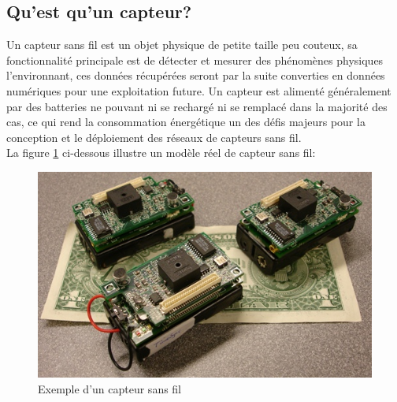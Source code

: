 	\subsection{Qu'est qu'un capteur?}
	Un capteur sans fil est un objet physique de petite taille peu couteux, sa fonctionnalité principale est de détecter et mesurer des phénomènes physiques l'environnant, ces données récupérées seront par la suite converties en données numériques pour une exploitation future. Un capteur est alimenté généralement par des batteries ne pouvant ni se rechargé ni se remplacé dans la majorité des cas, ce qui rend la consommation énergétique un des défis majeurs pour la conception et le déploiement des réseaux de capteurs sans fil.\\ La figure \ref{capteur} ci-dessous illustre un modèle réel de capteur sans fil:
	\begin{figure}[h]
	\begin{center}
	\includegraphics[scale=0.5]{Chapitre1/capteur.jpg}
	\caption{\label{capteur}Exemple d'un capteur sans fil}
	\end{center}
	\end{figure}
	
	
	
	
